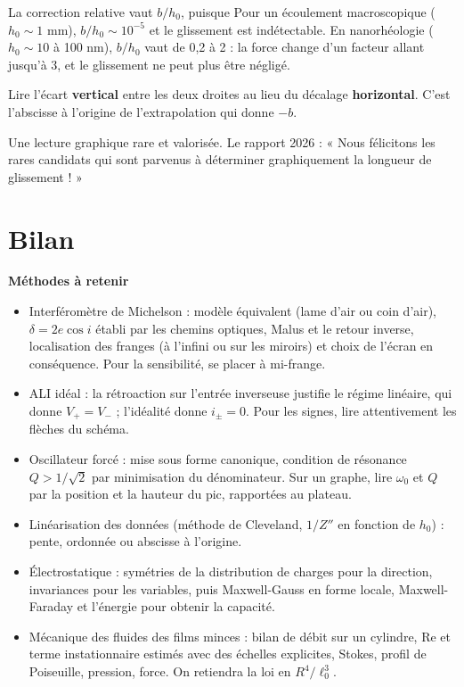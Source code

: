 \documentclass[11pt,a4paper]{article}
\providecommand{\tightlist}{\setlength{\itemsep}{0pt}\setlength{\parskip}{0pt}}
\newcommand{\equationajustee}[1]{%
  \sbox{\boiteequation}{$\displaystyle #1$}%
  \ifdim\wd\boiteequation>\linewidth
    \[\resizebox{\linewidth}{!}{\usebox{\boiteequation}}\]%
  \else
    \[#1\]%
  \fi}
\begin{document}
La correction relative vaut \(b/h_0\), puisque
\equationajustee{\frac{Z''_{\text{glissement}}}{Z''_{\text{\text{adhérence}}}}=\frac{1}{1+b/h_0} .}
Pour un écoulement macroscopique (\(h_0\sim1\) mm), \(b/h_0\sim10^{-5}\) et le glissement est indétectable. En nanorhéologie (\(h_0\sim10\) à 100 nm), \(b/h_0\) vaut de 0,2 à 2 : la force change d'un facteur allant jusqu'à 3, et le glissement ne peut plus être négligé.

\begin{piege}

Lire l'écart \textbf{vertical} entre les deux droites au lieu du décalage \textbf{horizontal}. C'est l'abscisse à l'origine de l'extrapolation qui donne \(-b\).

\end{piege}

\begin{jury}

Une lecture graphique rare et valorisée. Le rapport 2026 : « Nous félicitons les rares candidats qui sont parvenus à déterminer graphiquement la longueur de glissement ! »

\end{jury}

\hypertarget{bilan}{%
\section{Bilan}\label{bilan}}

\textbf{Méthodes à retenir}

\begin{itemize}
\tightlist
\item
  Interféromètre de Michelson : modèle équivalent (lame d'air ou coin d'air), \(\delta=2e\cos i\) établi par les chemins optiques, Malus et le retour inverse, localisation des franges (à l'infini ou sur les miroirs) et choix de l'écran en conséquence. Pour la sensibilité, se placer à mi-frange.
\item
  ALI idéal : la rétroaction sur l'entrée inverseuse justifie le régime linéaire, qui donne \(V_+=V_-\) ; l'idéalité donne \(i_\pm=0\). Pour les signes, lire attentivement les flèches du schéma.
\item
  Oscillateur forcé : mise sous forme canonique, condition de résonance \(Q>1/\sqrt2\) par minimisation du dénominateur. Sur un graphe, lire \(\omega_0\) et \(Q\) par la position et la hauteur du pic, rapportées au plateau.
\item
  Linéarisation des données (méthode de Cleveland, \(1/Z''\) en fonction de \(h_0\)) : pente, ordonnée ou abscisse à l'origine.
\item
  Électrostatique : symétries de la distribution de charges pour la direction, invariances pour les variables, puis Maxwell-Gauss en forme locale, Maxwell-Faraday et l'énergie pour obtenir la capacité.
\item
  Mécanique des fluides des films minces : bilan de débit sur un cylindre, \(\mathrm{Re}\) et terme instationnaire estimés avec des échelles explicites, Stokes, profil de Poiseuille, pression, force. On retiendra la loi en \(R^4/\ell_0^3\).
\end{itemize}
\end{document}
